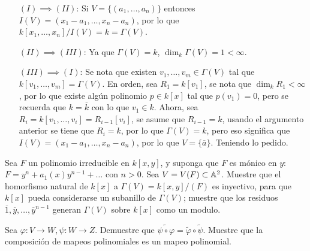 \begin{sol}{2.4}
    \begin{itemize}
        \item[\underline{\((I)\implies (II)\)}:] Si \(V=\{(a_1,\dots,a_n)\}\) entonces \(I(V)=(x_1-a_1,\dots,x_n-a_n)\), por lo que \(k[x_1,\dots,x_n]/I(V)=k=\Gamma(V)\).
        \item[\underline{\((II)\implies(III)\)}:] Ya que \(\Gamma(V)=k\), \(\dim_k\Gamma(V)=1<\infty\).
        \item[\underline{\((III)\implies(I)\)}:] Se nota que existen \(v_1,\dots,v_m\in\Gamma(V)\) tal que \(k[v_1,\dots,v_m]=\Gamma(V)\). En orden, sea \(R_1=k[v_1]\), se nota que \(\dim_kR_1<\infty\), por lo que existe algún polinomio \(p\in k[x]\) tal que \(p(v_1)=0\), pero se recuerda que \(k=\overline{k}\) con lo que \(v_1\in k\). Ahora, sea \(R_i=k[v_1,\dots,v_i]=R_{i-1}[v_i]\), se asume que \(R_{i-1}=k\), usando el argumento anterior se tiene que \(R_i=k\), por lo que \(\Gamma(V)=k\), pero eso significa que \(I(V)=(x_1-a_1,\dots,x_n-a_n)\), por lo  que \(V=\{\overline{a}\}\). Teniendo lo pedido.
    \end{itemize}
\end{sol}

\begin{prob}{2.5}
    Sea \(F\) un polinomio irreducible en \(k[x,y]\), y suponga que \(F\) es mónico en \(y\): \(F=y^n+a_1(x)y^{n-1}+\dots \) con \(n>0\). Sea \(V=V(F)\subset\mathbb{A}^2\). Muestre que el homorfismo natural de \(k[x]\) a \(\Gamma(V)=k[x,y]/(F)\) es inyectivo, para que \(k[x]\) pueda considerarse un subanillo de \(\Gamma(V)\); muestre que los residuos \(\overline{1},\overline{y},\dots ,\overline{y}^{n-1}\) generan \(\Gamma(V)\) sobre \(k[x]\) como un modulo.
\end{prob}

\begin{sol}{2.5}

\end{sol}

\begin{prob}{2.6}
    Sea \(\varphi:V\rightarrow W,\psi:W\rightarrow Z\). Demuestre que \(\widetilde{\psi\circ\varphi}=\widetilde{\varphi}\circ\widetilde{\psi}\). Muestre que la composición de mapeos polinomiales es un mapeo polinomial.
\end{prob}

